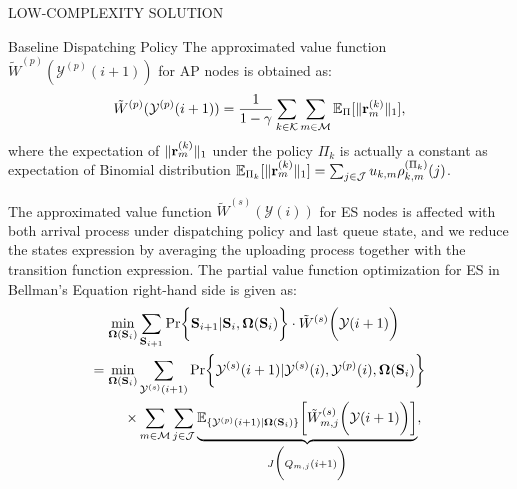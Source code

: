 \documentclass[10pt, conference, letterpaper]{IEEEtran}
\newcommand{\define}{\triangleq}
\newcommand{\leadto}{\Rightarrow}
\renewcommand{\vec}{\mathbf}
\DeclarePairedDelimiter{\set}{\{}{\}}
\DeclarePairedDelimiter{\Inorm}{\|}{\|_1}
\DeclarePairedDelimiter{\Paren}{\bigg(}{\bigg)}
\DeclarePairedDelimiter{\Bracket}{\bigg[}{\bigg]}
\DeclarePairedDelimiter{\Brace}{\bigg\{}{\bigg\}}
\newcommand{\apSet}{\mathcal{K}}
\newcommand{\esSet}{\mathcal{M}}
\newcommand{\jSpace}{\mathcal{J}}
\newcommand{\Stat}{\mathbf{S}}
\newcommand{\Obsv}{\mathcal{Y}}
\newcommand{\Policy}{\mathbf{\Omega}}
\begin{document}
\begin{section}{LOW-COMPLEXITY SOLUTION}
\begin{subsection}{Baseline Dispatching Policy}
            The approximated value function $\tilde{W}^{(p)}(\Obsv^{(p)}(i+1))$ for AP nodes is obtained as:
            \begin{align}
                \tilde{W}^{(p)}(\Obsv^{(p)}(i+1)) = \frac{1}{1-\gamma}
                    \sum_{k\in\apSet}\sum_{m\in\esSet} \mathbb{E}_{\Pi}[\Inorm{\vec{r}^{(k)}_{m}}],
            \end{align}
            where the expectation of $\Inorm{\vec{r}^{(k)}_{m}}$ under the policy $\Pi_k$ is actually a constant as expectation of Binomial distribution $\mathbb{E}_{\Pi_k}[\Inorm{\vec{r}^{(k)}_{m}}] = \sum_{j\in\jSpace} u_{k,m} \rho^{(\Pi_k)}_{k,m}(j)$.
            
            The approximated value function $\tilde{W}^{(s)}(\Obsv(i))$ for ES nodes is affected with both arrival process under dispatching policy and last queue state, and we reduce the states expression by averaging the uploading process together with the transition function expression.
            The partial value function optimization for ES in Bellman's Equation right-hand side is given as:
            \begin{align}
                \min_{\Policy(\Stat_i)}& \sum_{\Stat_{i+1}}
                    \Pr\Brace{\Stat_{i+1}|\Stat_{i}, \Policy(\Stat_i)} \cdot \tilde{W}^{(s)}\Paren{\Obsv(i+1)}
                \nonumber\\
                = \min_{\Policy(\Stat_i)}& \sum_{\Obsv^{(s)}(i+1)}
                    \Pr\Brace{\Obsv^{(s)}(i+1)|\Obsv^{(s)}(i), \Obsv^{(p)}(i), \Policy(\Stat_i)}
                    \nonumber\\
                    \times& \sum_{m\in\esSet} \sum_{j\in\jSpace}
                        \underbrace{
                            \mathbb{E}_{\set{\Obsv^{(p)}(i+1)|\Policy(\Stat_i)}} \Bracket{\tilde{W}^{(s)}_{m,j}\Paren{\Obsv(i+1)}}
                        }_{
                            J\Paren{Q_{m,j}(i+1)}
                        },
            \end{align}

\end{subsection}
\end{section}
\end{document}
